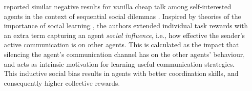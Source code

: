  reported similar negative results for vanilla cheap talk among 
self-interested agents in the context of sequential social dilemmas \cite{Leibo:etal:2017}. %
Inspired by theories of the importance of social learning \cite{Herrmann:etal:2007}, the authors extended individual task rewards with an extra term capturing an agent \emph{social influence}, i.e., how effective the sender's active communication is on other agents. This is calculated as the impact that silencing the agent's communication channel has on the other agents' behaviour, and acts as intrinsic motivation for learning useful communication strategies. %
This inductive social bias results in agents with better
coordination skills, and consequently higher collective rewards.
